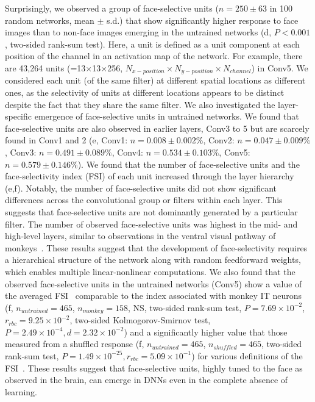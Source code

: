 \documentclass[sn-mathphys]{sn-jnl}%
\theoremstyle{thmstyleone}%
\theoremstyle{thmstyletwo}%
\theoremstyle{thmstylethree}%
\begin{document}
Surprisingly, we observed a group of face-selective units ($ n = 250 \pm 63 $ in 100 random networks, mean $ \pm $ s.d.) that show significantly higher response to face images than to non-face images emerging in the untrained networks (d, $ P<0.001 $, two-sided rank-sum test).
Here, a unit is defined as a unit component at each position of the channel in an activation map of the network.
For example, there are 43,264 units (=13$\times$13$\times$256, $ N_{x-position} \times N_{y-position} \times N_{channel} $) in Conv5.
We considered each unit (of the same filter) at different spatial locations as different ones, as the selectivity of units at different locations appears to be distinct despite the fact that they share the same filter.
We also investigated the layer-specific emergence of face-selective units in untrained networks.
We found that face-selective units are also observed in earlier layers, Conv3 to 5 but are scarcely found in Conv1 and 2 (e, 
Conv1: $ n=0.008 \pm0.002\% $, 
Conv2: $ n=0.047 \pm 0.009\% $, 
Conv3: $ n=0.491 \pm 0.089\% $, 
Conv4: $ n=0.534 \pm 0.103\% $,
Conv5: $ n=0.579 \pm 0.146\% $).
We found that the number of face-selective units and the face-selectivity index (FSI) of each unit increased through the layer hierarchy (e,f).
Notably, the number of face-selective units did not show significant differences across the convolutional group or filters within each layer.
This suggests that face-selective units are not dominantly generated by a particular filter.
The number of observed face-selective units was highest in the mid- and high-level layers, similar to observations in the ventral visual pathway of monkeys~\cite{tsao2006cortical,livingstone2017development}.
These results suggest that the development of face-selectivity requires a hierarchical structure of the network along with random feedforward weights, which enables multiple linear-nonlinear computations.
We also found that the observed face-selective units in the untrained networks (Conv5) show a value of the averaged FSI~\cite{tsao2006cortical,freiwald2010functional} comparable to the index associated with monkey IT neurons (f, $ n_{untrained} = 465 $, $ n_{monkey} = 158 $, NS, two-sided rank-sum test, $ P=7.69 \times 10 ^{-2} $, $ r_{rbc} = 9.25 \times 10^{-2} $, two-sided Kolmogorov-Smirnov test, $ P=2.49 \times 10^{-4}, d=2.32 \times 10^{-2} $)
and a significantly higher value that those measured from a shuffled response (f, $ n_{untrained} = 465 $, $ n_{shuffled} = 465 $, two-sided rank-sum test, $ P=1.49 \times 10^{-25}, r_{rbc} = 5.09 \times 10^{-1} $) for various definitions of the FSI~\cite{tsao2006cortical,aparicio2016neurophysiological,duyck2021color}.
These results suggest that face-selective units, highly tuned to the face as observed in the brain, can emerge in DNNs even in the complete absence of learning.
\end{document}
